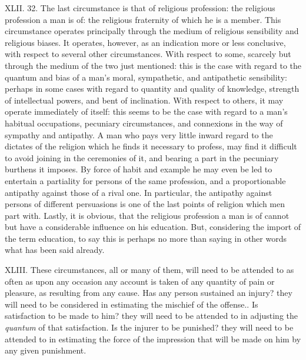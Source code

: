\documentclass[12pt]{report}
\begin{document}
XLII. 32. The last circumstance is that of religious profession: the
religious profession a man is of: the religious fraternity of which he
is a member. This circumstance operates principally through the medium
of religious sensibility and religious biases. It operates, however, as
an indication more or less conclusive, with respect to several other
circumstances. With respect to some, scarcely but through the medium of
the two just mentioned: this is the case with regard to the quantum and
bias of a man's moral, sympathetic, and antipathetic sensibility:
perhaps in some cases with regard to quantity and quality of knowledge,
strength of intellectual powers, and bent of inclination. With respect
to others, it may operate immediately of itself: this seems to be the
case with regard to a man's habitual occupations, pecuniary
circumstances, and connexions in the way of sympathy and antipathy. A
man who pays very little inward regard to the dictates of the religion
which he finds it necessary to profess, may find it difficult to avoid
joining in the ceremonies of it, and bearing a part in the pecuniary
burthens it imposes. By force of habit and example he may even be led to
entertain a partiality for persons of the same profession, and a
proportionable antipathy against those of a rival one. In particular,
the antipathy against persons of different persuasions is one of the
last points of religion which men part with. Lastly, it is obvious, that
the religious profession a man is of cannot but have a considerable
influence on his education. But, considering the import of the term
education, to say this is perhaps no more than saying in other words
what has been said already.

XLIII. These circumstances, all or many of them, will need to be
attended to as often as upon any occasion any account is taken of any
quantity of pain or pleasure, as resulting from any cause. Has any
person sustained an injury? they will need to be considered in
estimating the mischief of the offense.. Is satisfaction to be made to
him? they will need to be attended to in adjusting the \emph{quantum} of
that satisfaction. Is the injurer to be punished? they will need to be
attended to in estimating the force of the impression that will be made
on him by any given punishment.
\end{document}
